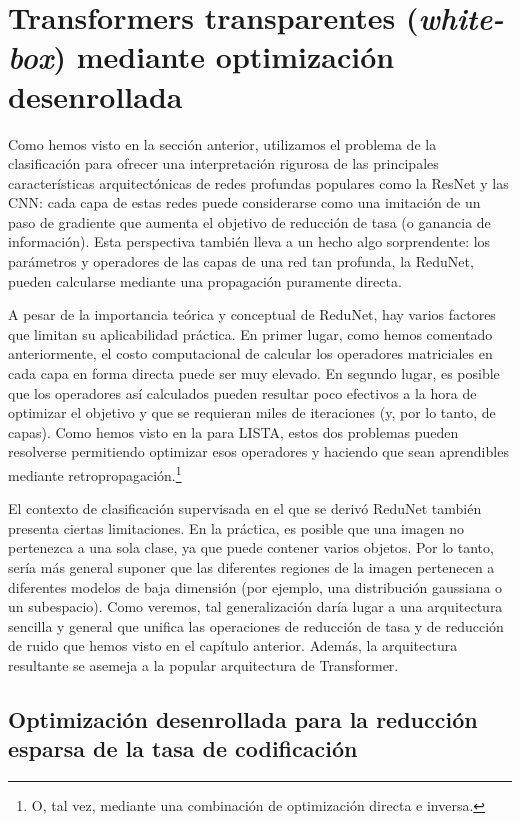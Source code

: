 \documentclass[../../book-main.tex]{subfiles}
\begin{document}
\section{Transformers transparentes (\textit{white-box}) mediante optimización 
desenrollada}\label{sec:chap4-white-box-transformer}
Como hemos visto en la sección anterior, utilizamos el problema de la
clasificación para ofrecer una interpretación rigurosa de las principales
características arquitectónicas de redes profundas populares como la
ResNet y las CNN: cada capa de estas redes puede considerarse como
una imitación de un paso de gradiente que aumenta el objetivo de
reducción de tasa (o ganancia de información). Esta perspectiva también lleva a un
hecho algo sorprendente: los parámetros y operadores  de las
capas de una red tan profunda, la ReduNet, pueden calcularse mediante una propagación 
puramente directa.

A pesar de la importancia teórica y conceptual de ReduNet,
hay varios factores que limitan su aplicabilidad práctica. En primer lugar, como hemos
comentado anteriormente, el costo computacional de calcular los
operadores matriciales en cada capa en forma directa puede ser muy
elevado. En segundo lugar, es posible que los operadores así calculados pueden resultar poco efectivos a la hora de
optimizar el objetivo y que se requieran miles de iteraciones 
(y, por lo tanto, de capas). Como hemos visto en la  para LISTA, estos
dos problemas pueden resolverse permitiendo optimizar esos operadores
y haciendo que sean aprendibles mediante retropropagación.\footnote{O, tal vez,
mediante una combinación de optimización directa e inversa.}

El contexto de clasificación supervisada en el que se derivó ReduNet
también presenta ciertas limitaciones. En la práctica, es posible que una imagen no
pertenezca a una sola clase, ya que puede contener varios objetos. Por lo tanto,
sería más general suponer que las diferentes regiones de la imagen
pertenecen a  diferentes modelos de baja dimensión (por ejemplo, una distribución gaussiana o un
subespacio). Como veremos, tal generalización daría lugar a una arquitectura
sencilla y general que unifica las operaciones de reducción de tasa y
de reducción de ruido que hemos visto en el capítulo anterior.
Además, la arquitectura resultante se asemeja a la popular
arquitectura de Transformer.

\subsection{Optimización desenrollada para la reducción esparsa de la tasa de codificación}
\end{document}
